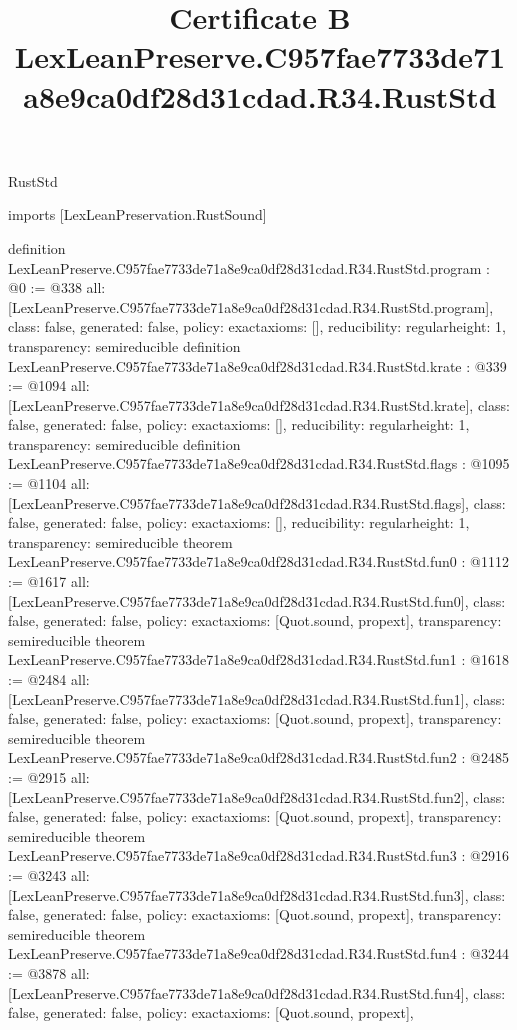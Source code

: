 \begin{lexlean}{RustStd}
\title{Certificate B LexLeanPreserve.C957fae7733de71a8e9ca0df28d31cdad.R34.RustStd}
\begin{coremodule}
imports [LexLeanPreservation.RustSound]

definition LexLeanPreserve.C957fae7733de71a8e9ca0df28d31cdad.R34.RustStd.program : @0 := @338 {
  all: [LexLeanPreserve.C957fae7733de71a8e9ca0df28d31cdad.R34.RustStd.program],
  class: false,
  generated: false,
  policy: exact{axioms: []},
  reducibility: regular{height: 1},
  transparency: semireducible
}
definition LexLeanPreserve.C957fae7733de71a8e9ca0df28d31cdad.R34.RustStd.krate : @339 := @1094 {
  all: [LexLeanPreserve.C957fae7733de71a8e9ca0df28d31cdad.R34.RustStd.krate],
  class: false,
  generated: false,
  policy: exact{axioms: []},
  reducibility: regular{height: 1},
  transparency: semireducible
}
definition LexLeanPreserve.C957fae7733de71a8e9ca0df28d31cdad.R34.RustStd.flags : @1095 := @1104 {
  all: [LexLeanPreserve.C957fae7733de71a8e9ca0df28d31cdad.R34.RustStd.flags],
  class: false,
  generated: false,
  policy: exact{axioms: []},
  reducibility: regular{height: 1},
  transparency: semireducible
}
theorem LexLeanPreserve.C957fae7733de71a8e9ca0df28d31cdad.R34.RustStd.fun0 : @1112 := @1617 {
  all: [LexLeanPreserve.C957fae7733de71a8e9ca0df28d31cdad.R34.RustStd.fun0],
  class: false,
  generated: false,
  policy: exact{axioms: [Quot.sound, propext]},
  transparency: semireducible
}
theorem LexLeanPreserve.C957fae7733de71a8e9ca0df28d31cdad.R34.RustStd.fun1 : @1618 := @2484 {
  all: [LexLeanPreserve.C957fae7733de71a8e9ca0df28d31cdad.R34.RustStd.fun1],
  class: false,
  generated: false,
  policy: exact{axioms: [Quot.sound, propext]},
  transparency: semireducible
}
theorem LexLeanPreserve.C957fae7733de71a8e9ca0df28d31cdad.R34.RustStd.fun2 : @2485 := @2915 {
  all: [LexLeanPreserve.C957fae7733de71a8e9ca0df28d31cdad.R34.RustStd.fun2],
  class: false,
  generated: false,
  policy: exact{axioms: [Quot.sound, propext]},
  transparency: semireducible
}
theorem LexLeanPreserve.C957fae7733de71a8e9ca0df28d31cdad.R34.RustStd.fun3 : @2916 := @3243 {
  all: [LexLeanPreserve.C957fae7733de71a8e9ca0df28d31cdad.R34.RustStd.fun3],
  class: false,
  generated: false,
  policy: exact{axioms: [Quot.sound, propext]},
  transparency: semireducible
}
theorem LexLeanPreserve.C957fae7733de71a8e9ca0df28d31cdad.R34.RustStd.fun4 : @3244 := @3878 {
  all: [LexLeanPreserve.C957fae7733de71a8e9ca0df28d31cdad.R34.RustStd.fun4],
  class: false,
  generated: false,
  policy: exact{axioms: [Quot.sound, propext]},
}
\end{coremodule}
\end{lexlean}
